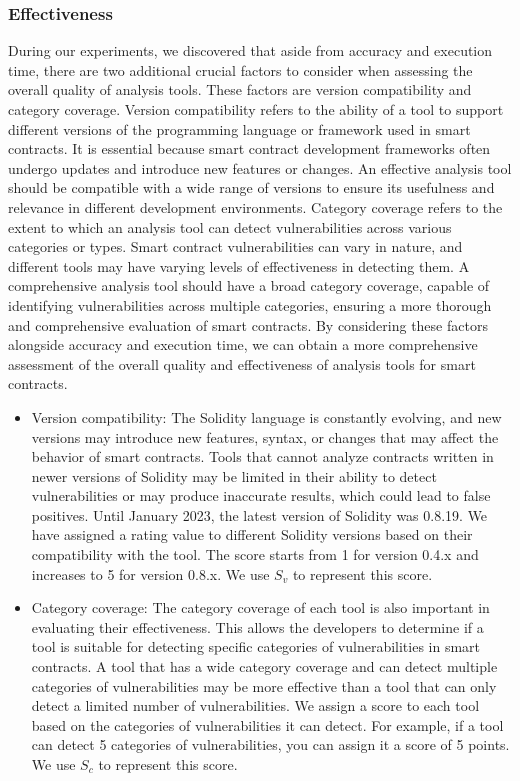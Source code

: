 \documentclass[manuscript,screen]{acmart}
\begin{document}
\subsubsection{Effectiveness}
During our experiments, we discovered that aside from accuracy and execution time, there are two additional crucial factors to consider when assessing the overall quality of analysis tools. These factors are version compatibility and category coverage. Version compatibility refers to the ability of a tool to support different versions of the programming language or framework used in smart contracts. It is essential because smart contract development frameworks often undergo updates and introduce new features or changes. An effective analysis tool should be compatible with a wide range of versions to ensure its usefulness and relevance in different development environments. Category coverage refers to the extent to which an analysis tool can detect vulnerabilities across various categories or types. Smart contract vulnerabilities can vary in nature, and different tools may have varying levels of effectiveness in detecting them. A comprehensive analysis tool should have a broad category coverage, capable of identifying vulnerabilities across multiple categories, ensuring a more thorough and comprehensive evaluation of smart contracts. By considering these factors alongside accuracy and execution time, we can obtain a more comprehensive assessment of the overall quality and effectiveness of analysis tools for smart contracts.


\begin{itemize}
  \item{Version compatibility}: The Solidity language is constantly evolving, and new versions may introduce new features, syntax, or changes that may affect the behavior of smart contracts. Tools that cannot analyze contracts written in newer versions of Solidity may be limited in their ability to detect vulnerabilities or may produce inaccurate results, which could lead to false positives. Until January 2023, the latest version of Solidity was 0.8.19. We have assigned a rating value to different Solidity versions based on their compatibility with the tool. The score starts from 1 for version 0.4.x and increases to 5 for version 0.8.x. We use $S_{v}$ to represent this score.
  \item{Category coverage}: The category coverage of each tool is also important in evaluating their effectiveness. This allows the developers to determine if a tool is suitable for detecting specific categories of vulnerabilities in smart contracts. A tool that has a wide category coverage and can detect multiple categories of vulnerabilities may be more effective than a tool that can only detect a limited number of vulnerabilities. We assign a score to each tool based on the categories of vulnerabilities it can detect. For example, if a tool can detect 5 categories of vulnerabilities, you can assign it a score of 5 points. We use $S_{c}$ to represent this score. 
\end{itemize}
\end{document}
